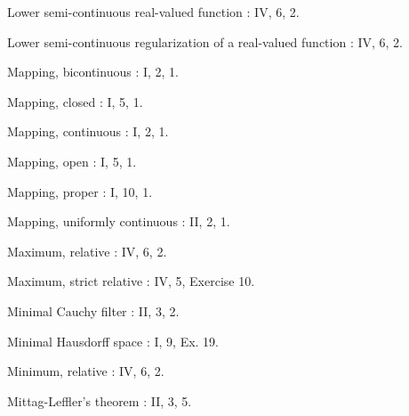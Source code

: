 Lower semi-continuous real-valued function : IV, 6, 2.

Lower semi-continuous regularization of a real-valued function : IV, 6, 2.

Mapping, bicontinuous : I, 2, 1.

Mapping, closed : I, 5, 1.

Mapping, continuous : I, 2, 1.

Mapping, open : I, 5, 1.

Mapping, proper : I, 10, 1.

Mapping, uniformly continuous : II, 2, 1.

Maximum, relative : IV, 6, 2.

Maximum, strict relative : IV, 5, Exercise 10.

Minimal Cauchy filter : II, 3, 2.

Minimal Hausdorff space : I, 9, Ex. 19.

Minimum, relative : IV, 6, 2.

Mittag-Leffler's theorem : II, 3, 5.

